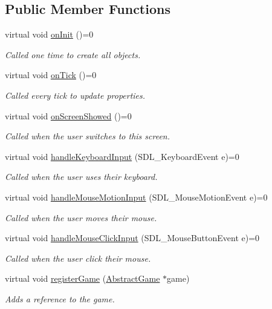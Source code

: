 \subsection*{Public Member Functions}
\begin{DoxyCompactItemize}
\item 
virtual void \mbox{\hyperlink{class_abstract_screen_a7ab389bd33f4824d3d353b5a9e1616de}{on\+Init}} ()=0
\begin{DoxyCompactList}\small\item\em Called one time to create all objects. \end{DoxyCompactList}\item 
virtual void \mbox{\hyperlink{class_abstract_screen_a3861213630fd23d4a3ff392191614ec2}{on\+Tick}} ()=0
\begin{DoxyCompactList}\small\item\em Called every tick to update properties. \end{DoxyCompactList}\item 
virtual void \mbox{\hyperlink{class_abstract_screen_a219687a34e6aed15a9eaf0d4414d1783}{on\+Screen\+Showed}} ()=0
\begin{DoxyCompactList}\small\item\em Called when the user switches to this screen. \end{DoxyCompactList}\item 
virtual void \mbox{\hyperlink{class_abstract_screen_ad618b78e55faf59bab580e920461b790}{handle\+Keyboard\+Input}} (S\+D\+L\+\_\+\+Keyboard\+Event e)=0
\begin{DoxyCompactList}\small\item\em Called when the user uses their keyboard. \end{DoxyCompactList}\item 
virtual void \mbox{\hyperlink{class_abstract_screen_ab05039a94ee494811800187787636d2b}{handle\+Mouse\+Motion\+Input}} (S\+D\+L\+\_\+\+Mouse\+Motion\+Event e)=0
\begin{DoxyCompactList}\small\item\em Called when the user moves their mouse. \end{DoxyCompactList}\item 
virtual void \mbox{\hyperlink{class_abstract_screen_a9f9631ff1a9078b96bcf31e062f7379e}{handle\+Mouse\+Click\+Input}} (S\+D\+L\+\_\+\+Mouse\+Button\+Event e)=0
\begin{DoxyCompactList}\small\item\em Called when the user click their mouse. \end{DoxyCompactList}\item 
virtual void \mbox{\hyperlink{class_abstract_screen_a64d29254d2ad4f9c8050e8f56d3c27a8}{register\+Game}} (\mbox{\hyperlink{class_abstract_game}{Abstract\+Game}} $\ast$game)
\begin{DoxyCompactList}\small\item\em Adds a reference to the game. \end{DoxyCompactList}\end{DoxyCompactItemize}
